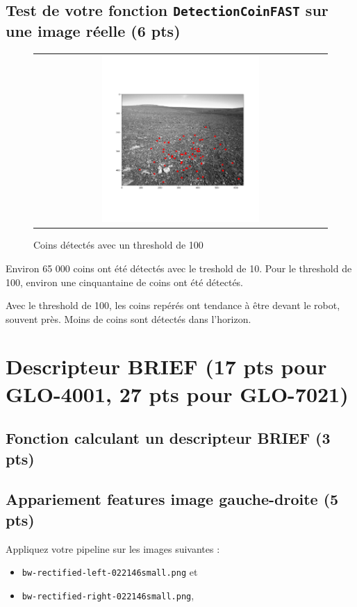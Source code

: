 \documentclass[12pt]{article}
\begin{document}
\subsection{Test de votre fonction \texttt{DetectionCoinFAST} sur une image réelle (6 pts)}

\begin{figure}[ht]
 \begin{center}
  \begin{tabular}{c}
    \includegraphics[width=0.55\textwidth]{q4-detection-keypoint.png}
  \end{tabular}
 \end{center}
\vspace{-0.25in}
 \caption{Coins d\'etect\'es avec un threshold de 100}
    \label{detection-coin-100}
\end{figure}

Environ 65 000 coins ont \'et\'e d\'etect\'es avec le treshold de 10.
Pour le threshold de 100, environ une cinquantaine de coins ont \'et\'e d\'etect\'es.

Avec le threshold de 100, les coins rep\'er\'es ont tendance \`a \^etre devant le robot, souvent pr\`es.
Moins de coins sont d\'etect\'es dans l'horizon.

\newpage
\section{Descripteur BRIEF (17 pts pour GLO-4001, 27 pts pour GLO-7021)}

\subsection{Fonction calculant un descripteur BRIEF (3 pts)}

\subsection{Appariement features image gauche-droite (5 pts)}
 Appliquez votre pipeline sur les images suivantes :
 \begin{itemize}
 \item \texttt{bw-rectified-left-022146small.png} et
 \item \texttt{bw-rectified-right-022146small.png},
 \end{itemize}
\end{document}

